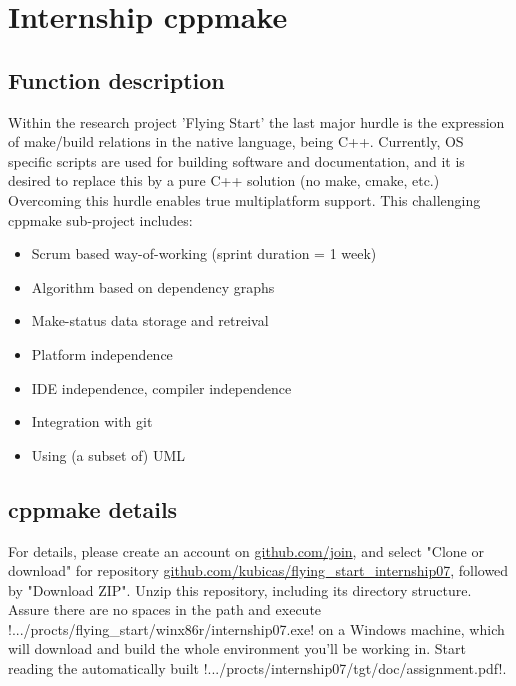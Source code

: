 \chapter*{Internship cppmake}
\section*{Function description}
Within the research project 'Flying Start' the last major hurdle is the
expression of make/build relations in the native language, being C++. Currently,
OS specific scripts are used for building software and documentation, and it is
desired to replace this by a pure C++ solution (no make, cmake, etc.) 
Overcoming this hurdle enables true multiplatform support.
This challenging cppmake sub-project includes:

\begin{itemize}
\item Scrum based way-of-working (sprint duration = 1 week)
\item Algorithm based on dependency graphs
\item Make-status data storage and retreival
\item Platform independence
\item IDE independence, compiler independence
\item Integration with git
\item Using (a subset of) UML
\end{itemize}

\section*{cppmake details}
For details, please create an account on \url{github.com/join}, and
select "Clone or download" for repository 
\url{github.com/kubicas/flying_start_internship07}, followed by "Download ZIP".
Unzip this repository, including its directory structure. Assure there are no
spaces in the path and execute 
!.../procts/flying_start/winx86r/internship07.exe! on a Windows machine, which will 
download and build the whole environment you'll be working in. Start reading 
the automatically built
!.../procts/internship07/tgt/doc/assignment.pdf!.

